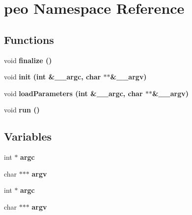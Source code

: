 \section{peo Namespace Reference}
\label{namespacepeo}


\subsection*{Functions}
\begin{CompactItemize}
\item 
void \bf{finalize} ()\label{namespacepeo_f90478489cc92d1e6abb222179163a30}

\item 
void \bf{init} (int \&\_\-\_\-argc, char $\ast$$\ast$\&\_\-\_\-argv)\label{namespacepeo_8184c3b1f7eecc68f69bb8e8b872a7d3}

\item 
void \bf{load\-Parameters} (int \&\_\-\_\-argc, char $\ast$$\ast$\&\_\-\_\-argv)\label{namespacepeo_2b496ee9b81d9ae322ae6edb9a93dc71}

\item 
void \bf{run} ()\label{namespacepeo_10819b2d60b37477c6a89b60c595c67c}

\end{CompactItemize}
\subsection*{Variables}
\begin{CompactItemize}
\item 
int $\ast$ \bf{argc}\label{namespacepeo_18a3998ce8b39c4e1143914fdd07b3d2}

\item 
char $\ast$$\ast$$\ast$ \bf{argv}\label{namespacepeo_d07043237d4d923125e38860ba9bbe20}

\item 
int $\ast$ \bf{argc}\label{namespacepeo_18a3998ce8b39c4e1143914fdd07b3d2}

\item 
char $\ast$$\ast$$\ast$ \bf{argv}\label{namespacepeo_d07043237d4d923125e38860ba9bbe20}

\end{CompactItemize}
